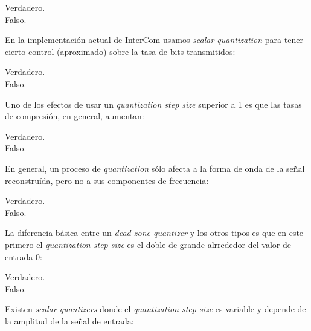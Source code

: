 \documentclass[legalpaper, 12pt, addpoints]{exam}
\begin{document}
\begin{questions}
\begin{oneparchoices}
  \choice Verdadero.\\
  \choice Falso.
\end{oneparchoices}
  
\vspace{0.10in}

\question En la implementación actual de InterCom usamos \emph{scalar
  quantization} para tener cierto control (aproximado) sobre la tasa
de bits transmitidos:

\begin{oneparchoices}
  \choice Verdadero.\\
  \choice Falso.
\end{oneparchoices}
  
\vspace{0.10in}

\question Uno de los efectos de usar un \emph{quantization step size}
superior a 1 es que las tasas de compresión, en general, aumentan:

\begin{oneparchoices}
  \choice Verdadero.\\
  \choice Falso.
\end{oneparchoices}
  
\vspace{0.10in}

\question En general, un proceso de \emph{quantization} sólo afecta a
la forma de onda de la señal reconstruída, pero no a sus componentes
de frecuencia:

\begin{oneparchoices}
  \choice Verdadero.\\
  \choice Falso.
\end{oneparchoices}
  
\vspace{0.10in}

\question La diferencia básica entre un \emph{dead-zone quantizer} y
los otros tipos es que en este primero el \emph{quantization step size} es
el doble de grande alrrededor del valor de entrada 0:

\begin{oneparchoices}
  \choice Verdadero.\\
  \choice Falso.
\end{oneparchoices}
  
\vspace{0.10in}

\question Existen \emph{scalar quantizers} donde el \emph{quantization
  step size} es variable y depende de la amplitud de la señal de entrada:


\end{questions}
\end{document}
